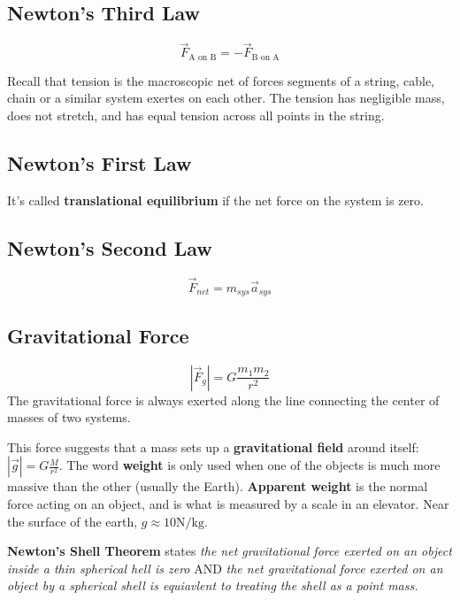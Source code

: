 \documentclass{article}
\begin{document}
\subsection{Newton's Third Law}
\[\vec{F}_{\textrm{A on B}} = -\vec{F}_{\textrm{B on A}}\]

Recall that tension is the macroscopic net of forces segments of a string, cable, chain or a similar system exertes on each other.
The tension has negligible mass, does not stretch, and has equal tension across all points in the string.

\subsection{Newton's First Law}

It's called \textbf{translational equilibrium} if the net force on the system is zero.

\subsection{Newton's Second Law}

\[\vec{F}_{net} = m_{sys} \vec{a}_{sys}\]

\subsection{Gravitational Force}

\begin{definition}
    \[|\vec{F}_g| = G \frac{m_1m_2}{r^2}\]
    The gravitational force is always exerted along the line connecting the center of masses of two systems.
\end{definition}

This force suggests that a mass sets up a \textbf{gravitational field} around itself: $|\vec{g}| = G\frac{M}{r^2}$.
The word \textbf{weight} is only used when one of the objects is much more massive than the other (usually the Earth).
\textbf{Apparent weight} is the normal force acting on an object, and is what is measured by a scale in an elevator.
Near the surface of the earth, $g \approx 10 \unit{\newton \per \kilogram}$.

\textbf{Newton's Shell Theorem} states \textit{the net gravitational force exerted on an object inside a thin spherical hell is zero} AND \textit{the net gravitational force exerted on an object by a spherical shell is equiavlent to treating the shell as a point mass.}
\end{document}
